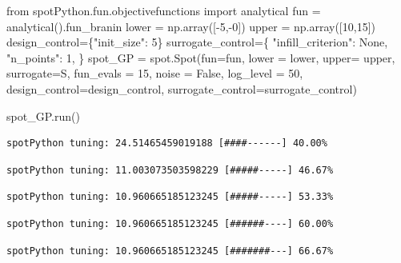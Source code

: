 \documentclass[
  letterpaper,
  DIV=11,
  numbers=noendperiod]{scrreprt}
\newenvironment{Shaded}{\begin{snugshade}}{\end{snugshade}}
\newcommand{\DecValTok}[1]{\textcolor[rgb]{0.68,0.00,0.00}{#1}}
\newcommand{\ImportTok}[1]{\textcolor[rgb]{0.00,0.46,0.62}{#1}}
\newcommand{\NormalTok}[1]{\textcolor[rgb]{0.00,0.23,0.31}{#1}}
\newcommand{\OperatorTok}[1]{\textcolor[rgb]{0.37,0.37,0.37}{#1}}
\newcommand{\StringTok}[1]{\textcolor[rgb]{0.13,0.47,0.30}{#1}}
\newcommand{\VariableTok}[1]{\textcolor[rgb]{0.07,0.07,0.07}{#1}}
\begin{document}
\begin{Shaded}
\begin{Highlighting}[]
\ImportTok{from}\NormalTok{ spotPython.fun.objectivefunctions }\ImportTok{import}\NormalTok{ analytical}
\NormalTok{fun }\OperatorTok{=}\NormalTok{ analytical().fun\_branin}
\NormalTok{lower }\OperatorTok{=}\NormalTok{ np.array([}\OperatorTok{{-}}\DecValTok{5}\NormalTok{,}\OperatorTok{{-}}\DecValTok{0}\NormalTok{])}
\NormalTok{upper }\OperatorTok{=}\NormalTok{ np.array([}\DecValTok{10}\NormalTok{,}\DecValTok{15}\NormalTok{])}
\NormalTok{design\_control}\OperatorTok{=}\NormalTok{\{}\StringTok{"init\_size"}\NormalTok{: }\DecValTok{5}\NormalTok{\}}
\NormalTok{surrogate\_control}\OperatorTok{=}\NormalTok{\{}
            \StringTok{"infill\_criterion"}\NormalTok{: }\VariableTok{None}\NormalTok{,}
            \StringTok{"n\_points"}\NormalTok{: }\DecValTok{1}\NormalTok{,}
\NormalTok{        \}}
\NormalTok{spot\_GP }\OperatorTok{=}\NormalTok{ spot.Spot(fun}\OperatorTok{=}\NormalTok{fun, lower }\OperatorTok{=}\NormalTok{ lower, upper}\OperatorTok{=}\NormalTok{ upper, surrogate}\OperatorTok{=}\NormalTok{S, }
\NormalTok{                    fun\_evals }\OperatorTok{=} \DecValTok{15}\NormalTok{, noise }\OperatorTok{=} \VariableTok{False}\NormalTok{, log\_level }\OperatorTok{=} \DecValTok{50}\NormalTok{,}
\NormalTok{                    design\_control}\OperatorTok{=}\NormalTok{design\_control,}
\NormalTok{                    surrogate\_control}\OperatorTok{=}\NormalTok{surrogate\_control)}

\NormalTok{spot\_GP.run()}
\end{Highlighting}
\end{Shaded}

\begin{verbatim}
spotPython tuning: 24.51465459019188 [####------] 40.00% 
\end{verbatim}

\begin{verbatim}
spotPython tuning: 11.003073503598229 [#####-----] 46.67% 
\end{verbatim}

\begin{verbatim}
spotPython tuning: 10.960665185123245 [#####-----] 53.33% 
\end{verbatim}

\begin{verbatim}
spotPython tuning: 10.960665185123245 [######----] 60.00% 
\end{verbatim}

\begin{verbatim}
spotPython tuning: 10.960665185123245 [#######---] 66.67% 
\end{verbatim}
\end{document}
